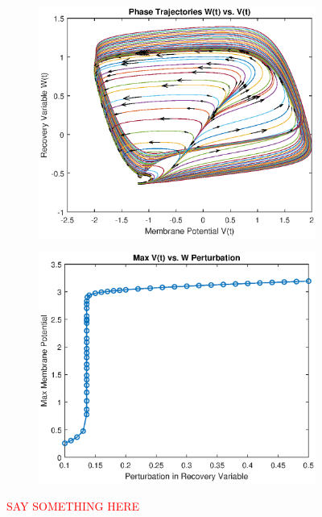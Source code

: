 \documentclass{book}
\theoremstyle{definition}
\begin{document}
\begin{figure}[!htb]
	\centering
	\begin{subfigure}{0.5\textwidth}
		\centering
		\includegraphics[scale=0.6]{FHN_lab/V_W_I_2.eps}
	\end{subfigure}%
	\begin{subfigure}{0.5\textwidth}
		\centering
		\includegraphics[scale=0.6]{FHN_lab/thres_I_2.eps}
		
	\end{subfigure}%
	\caption{\textcolor{red}{SAY SOMETHING HERE}}
	\label{Fig:13}
\end{figure}
\end{document}
